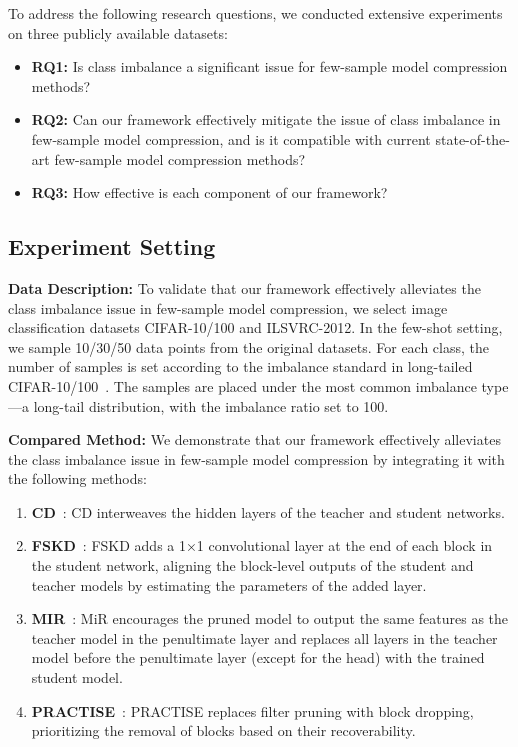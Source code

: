 \documentclass[twoside,11pt]{article}
\begin{document}
To address the following research questions, we conducted extensive experiments on three publicly available datasets:  
\begin{itemize}
    \item \textbf{RQ1:} Is class imbalance a significant issue for few-sample model compression methods?  
    \item \textbf{RQ2:} Can our framework effectively mitigate the issue of class imbalance in few-sample model compression, and is it compatible with current state-of-the-art few-sample model compression methods?  
    \item \textbf{RQ3:} How effective is each component of our framework?  
\end{itemize}

\subsection{Experiment Setting}
\noindent \textbf{Data Description:}
To validate that our framework effectively alleviates the class imbalance issue in few-sample model compression, we select image classification datasets CIFAR-10/100 and ILSVRC-2012. In the few-shot setting, we sample 10/30/50 data points from the original datasets. For each class, the number of samples is set according to the imbalance standard in long-tailed CIFAR-10/100~\citep{krizhevsky2009learning}. The samples are placed under the most common imbalance type—a long-tail distribution, with the imbalance ratio set to 100.

\noindent \textbf{Compared Method:}
We demonstrate that our framework effectively alleviates the class imbalance issue in few-sample model compression by integrating it with the following methods: 
\begin{enumerate}
    \item \textbf{CD}~\citep{bai2020few}: CD interweaves the hidden layers of the teacher and student networks.
    \item \textbf{FSKD}~\citep{li2020few}: FSKD adds a 1×1 convolutional layer at the end of each block in the student network, aligning the block-level outputs of the student and teacher models by estimating the parameters of the added layer.
    \item \textbf{MIR}~\citep{wang2022mir}: MiR encourages the pruned model to output the same features as the teacher model in the penultimate layer and replaces all layers in the teacher model before the penultimate layer (except for the head) with the trained student model.
    \item \textbf{PRACTISE}~\citep{wang2023practical}: PRACTISE replaces filter pruning with block dropping, prioritizing the removal of blocks based on their recoverability.
\end{enumerate}
\end{document}
